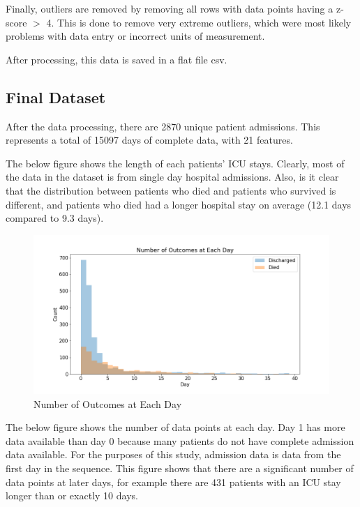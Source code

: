 \documentclass[12pt]{article}
\begin{document}
Finally, outliers are removed by removing all rows with data points having a z-score $>$ 4. This is done to remove very extreme outliers, which were most likely problems with data entry or incorrect units of measurement.

After processing, this data is saved in a flat file csv. 

\subsection{Final Dataset}

After the data processing, there are 2870 unique patient admissions. This represents a total of 15097 days of complete data, with 21 features.

The below figure shows the length of each patients' ICU stays. Clearly, most of the data in the dataset is from single day hospital admissions. Also, is it clear that the distribution between patients who died and patients who survived is different, and patients who died had a longer hospital stay on average (12.1 days compared to  9.3 days).

\begin{figure}[H]
\centering\caption{Number of Outcomes at Each Day}
\includegraphics[scale=0.45]{Number of Outcomes at Each Day.png}
\end{figure}
The below figure shows the number of data points at each day. Day 1 has more data available than day 0 because many patients do not have complete admission data available. For the purposes of this study, admission data is data from the first day in the sequence. This figure shows that there are a significant number of data points at later days, for example there are 431 patients with an ICU stay longer than or exactly 10 days.
\end{document}
